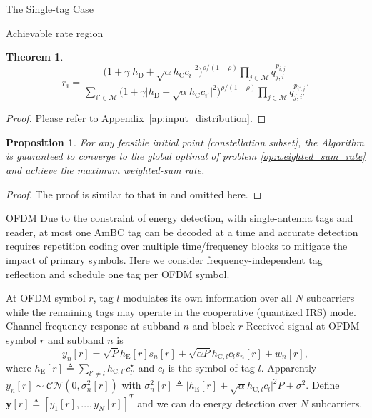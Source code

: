 \documentclass[journal]{IEEEtran}
\newtheorem{proposition}{Proposition}
\newtheorem{theorem}{Theorem}
\begin{document}
\begin{section}{The Single-tag Case}
\begin{subsection}{Achievable rate region}
\begin{theorem}
				\begin{equation}
					r_i = \frac{\bigl( 1 + \gamma \lvert h_{\mathrm{D}} + \sqrt{\alpha} h_{\mathrm{C}} c_i \rvert^2 \bigr)^{\rho / (1 - \rho)} \prod_{j \in \mathcal{M}} q_{j, i}^{p_{i,j}}}{\sum_{i' \in \mathcal{M}} \bigl( 1 + \gamma \lvert h_{\mathrm{D}} + \sqrt{\alpha} h_{\mathrm{C}} c_{i'} \rvert^2 \bigr)^{\rho / (1 - \rho)} \prod_{j \in \mathcal{M}} q_{j, i'}^{p_{i', j}}}.
					\label{eq:input_distribution}
				\end{equation}
				\label{th:input_distribution}
			\end{theorem}
			\begin{proof}
				Please refer to Appendix~\ref{ap:input_distribution}.
			\end{proof}
			\begin{proposition}
				For any feasible initial point [constellation subset], the Algorithm is guaranteed to converge to the global optimal of problem \eqref{op:weighted_sum_rate} and achieve the maximum weighted-sum rate.
			\end{proposition}
			\begin{proof}
				The proof is similar to that in \cite[Chapter~9.3]{Yeung2008} and omitted here.
			\end{proof}
		\end{subsection}
	\end{section}

	\begin{section}{OFDM}
		Due to the constraint of energy detection, with single-antenna tags and reader, at most one AmBC tag can be decoded at a time and accurate detection requires repetition coding over multiple time/frequency blocks to mitigate the impact of primary symbols. Here we consider frequency-independent tag reflection and schedule one tag per OFDM symbol.

		At OFDM symbol $r$, tag $l$ modulates its own information over all $N$ subcarriers while the remaining tags may operate in the cooperative (quantized IRS) mode. Channel frequency response at subband $n$ and block $r$
		Received signal at OFDM symbol $r$ and subband $n$ is
		\begin{equation}
			y_n[r] = \sqrt{P} h_{\mathrm{E}}[r] s_n[r] + \sqrt{\alpha P} h_{\mathrm{C},l} c_l s_n[r] + w_n[r],
		\end{equation}
		where $h_{\mathrm{E}}[r] \triangleq \sum_{l' \ne l} h_{\mathrm{C},l'} c_{l'}^\star$ and $c_l$ is the symbol of tag $l$. Apparently $y_n[r] \sim \mathcal{CN}(0,\sigma_n^2[r])$ with $\sigma_n^2[r] \triangleq \lvert h_{\mathrm{E}}[r] + \sqrt{\alpha} h_{\mathrm{C},l} c_l \rvert^2 P + \sigma^2$. Define $\boldsymbol{y}[r] \triangleq [y_1[r],\ldots,y_N[r]]^T$ and we can do energy detection over $N$ subcarriers.
	\end{section}
\end{document}

